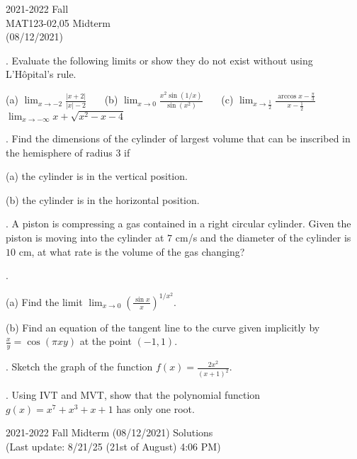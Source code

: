 \documentclass{article}
\begin{document}
\pagestyle{empty}
\large

\begin{center}
2021-2022 Fall\\MAT123-02,05 Midterm\\(08/12/2021)
\end{center}

. Evaluate the following limits or show they do not exist without using L'Hôpital's rule.

\hfill

(a) $\displaystyle \lim_{x\to-2}\frac{\left|x+2\right|}{\left|x\right|-2}$ \ \ \ (b) $\displaystyle\lim_{x\to0}\frac{x^2\sin(1/x)}{\sin\left(x^2\right)}$ \ \ \ (c) $\displaystyle \lim_{x\to\frac12}\frac{\arccos x- \frac\pi3}{x-\frac12}$ \ \ \ $\displaystyle\lim_{x\to-\infty}x+\sqrt{x^2-x-4}$

\hfill

. Find the dimensions of the cylinder of largest volume that can be inscribed in the hemisphere of radius $3$ if

\hfill

(a) the cylinder is in the vertical position.

\hfill

(b) the cylinder is in the horizontal position.

\hfill

. A piston is compressing a gas contained in a right circular cylinder. Given the piston is moving into the cylinder at $7 $ cm/s and the diameter of the cylinder is $10$ cm, at what rate is the volume of the gas changing?

\hfill

.

(a) Find the limit $\displaystyle\lim_{x\to0}\left(\frac{\sin x}x\right)^{1/x^2}$.

\hfill

(b) Find an equation of the tangent line to the curve given implicitly by $\displaystyle \frac xy=\cos\left(\pi xy\right)$ at the point $(-1,1)$.

\hfill

. Sketch the graph of the function $\displaystyle f(x)=\frac{2x^2}{\left(x+1\right)^2}$.

\hfill

. Using IVT and MVT, show that the polynomial function $g(x) = x^7+x^3+x+1$ has only one root.

\newpage

\begin{center}
2021-2022 Fall Midterm (08/12/2021) Solutions\\
(Last update: 8/21/25 (21st of August) 4:06 PM)
\end{center}
\end{document}
